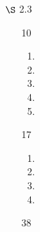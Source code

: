 \documentclass[12pt,letterpaper]{article}
\begin{document}
\begin{enumerate}
    \item [$\S$ 2.3]

      \begin{enumerate}
        \item [10]
          \begin{enumerate}[label=(\arabic*)]
            \item
            \item
            \item
            \item
            \item
          \end{enumerate}
        \item [17]
          \begin{enumerate}[label=(\arabic*)]
            \item
            \item
            \item
            \item
          \end{enumerate}
        \item [38]
      \end{enumerate}
  \end{enumerate}
\end{document}
